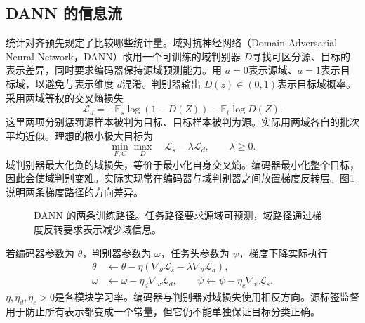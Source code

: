 \subsection{DANN 的信息流}
统计对齐预先规定了比较哪些统计量。域对抗神经网络（Domain-Adversarial Neural Network，DANN）改用一个可训练的域判别器 $D$寻找可区分源、目标的表示差异，同时要求编码器保持源域预测能力\cite{ganin2016dann}。用 $a=0$表示源域、$a=1$表示目标域，以避免与表示维度 $d$混淆。判别器输出 $D(z)\in(0,1)$表示目标域概率。采用两域等权的交叉熵损失
\begin{equation}
 \mathcal L_d=-\mathbb E_s\log(1-D(Z))-\mathbb E_t\log D(Z).
 \label{eq:transfer-domain-loss}
\end{equation}
这里两项分别惩罚源样本被判为目标、目标样本被判为源。实际用两域各自的批次平均近似。理想的极小极大目标为
\begin{equation}
\min_{F,C}\max_D\quad\mathcal L_s-\lambda\mathcal L_d,
\qquad\lambda\geq0.
\label{eq:transfer-dann}
\end{equation}
域判别器最大化负的域损失，等价于最小化自身交叉熵。编码器最小化整个目标，因此会使域判别变难。实际实现常在编码器与域判别器之间放置梯度反转层。图\ref{fig:transfer-dann}说明两条梯度路径的方向差异。

\begin{figure}[htbp]
\centering
{}
\caption{DANN 的两条训练路径。任务路径要求源域可预测，域路径通过梯度反转要求表示减少域信息。}
\label{fig:transfer-dann}
\end{figure}

若编码器参数为 $\theta$，判别器参数为 $\omega$，任务头参数为 $\psi$，梯度下降实际执行
\begin{align}
 \theta&\leftarrow\theta-\eta(\nabla_\theta\mathcal L_s-\lambda\nabla_\theta\mathcal L_d),\\
 \omega&\leftarrow\omega-\eta_d\nabla_\omega\mathcal L_d,
 \qquad\psi\leftarrow\psi-\eta_c\nabla_\psi\mathcal L_s.
\end{align}
$\eta,\eta_d,\eta_c>0$是各模块学习率。编码器与判别器对域损失使用相反方向。源标签监督用于防止所有表示都变成一个常量，但它仍不能单独保证目标分类正确。

